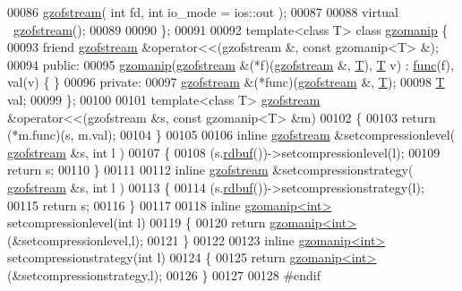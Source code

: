 \begin{DoxyCode}
00086   \hyperlink{classgzofstream}{gzofstream}( \textcolor{keywordtype}{int} fd, \textcolor{keywordtype}{int} io\_mode = ios::out );
00087 
00088   \textcolor{keyword}{virtual} ~\hyperlink{classgzofstream}{gzofstream}();
00089 
00090 \};
00091 
00092 \textcolor{keyword}{template}<\textcolor{keyword}{class} T> \textcolor{keyword}{class }\hyperlink{classgzomanip}{gzomanip} \{
00093   \textcolor{keyword}{friend} \hyperlink{classgzofstream}{gzofstream} &operator<<(gzofstream &, const gzomanip<T> &);
00094 \textcolor{keyword}{public}:
00095   \hyperlink{classgzomanip}{gzomanip}(\hyperlink{classgzofstream}{gzofstream} &(*f)(\hyperlink{classgzofstream}{gzofstream} &, \hyperlink{group___sparse_core___module_class_eigen_1_1_triplet}{T}), \hyperlink{group___sparse_core___module_class_eigen_1_1_triplet}{T} v) : 
      \hyperlink{structfunc}{func}(f), val(v) \{ \}
00096 \textcolor{keyword}{private}:
00097   \hyperlink{classgzofstream}{gzofstream} &(*func)(\hyperlink{classgzofstream}{gzofstream} &, \hyperlink{group___sparse_core___module_class_eigen_1_1_triplet}{T});
00098   \hyperlink{group___sparse_core___module_class_eigen_1_1_triplet}{T} val;
00099 \};
00100 
00101 \textcolor{keyword}{template}<\textcolor{keyword}{class} T> \hyperlink{classgzofstream}{gzofstream} &operator<<(gzofstream &s, const gzomanip<T> &m)
00102 \{
00103   \textcolor{keywordflow}{return} (*m.func)(s, m.val);
00104 \}
00105 
00106 \textcolor{keyword}{inline} \hyperlink{classgzofstream}{gzofstream} &setcompressionlevel( \hyperlink{classgzofstream}{gzofstream} &s, \textcolor{keywordtype}{int} l )
00107 \{
00108   (s.\hyperlink{classgzofstream_a2fef74202b114357f41cfeb28f1d2acc}{rdbuf}())->setcompressionlevel(l);
00109   \textcolor{keywordflow}{return} s;
00110 \}
00111 
00112 \textcolor{keyword}{inline} \hyperlink{classgzofstream}{gzofstream} &setcompressionstrategy( \hyperlink{classgzofstream}{gzofstream} &s, \textcolor{keywordtype}{int} l )
00113 \{
00114   (s.\hyperlink{classgzofstream_a2fef74202b114357f41cfeb28f1d2acc}{rdbuf}())->setcompressionstrategy(l);
00115   \textcolor{keywordflow}{return} s;
00116 \}
00117 
00118 \textcolor{keyword}{inline} \hyperlink{classgzomanip}{gzomanip<int>} setcompressionlevel(\textcolor{keywordtype}{int} l)
00119 \{
00120   \textcolor{keywordflow}{return} \hyperlink{classgzomanip}{gzomanip<int>}(&setcompressionlevel,l);
00121 \}
00122 
00123 \textcolor{keyword}{inline} \hyperlink{classgzomanip}{gzomanip<int>} setcompressionstrategy(\textcolor{keywordtype}{int} l)
00124 \{
00125   \textcolor{keywordflow}{return} \hyperlink{classgzomanip}{gzomanip<int>}(&setcompressionstrategy,l);
00126 \}
00127 
00128 \textcolor{preprocessor}{#endif}
\end{DoxyCode}
